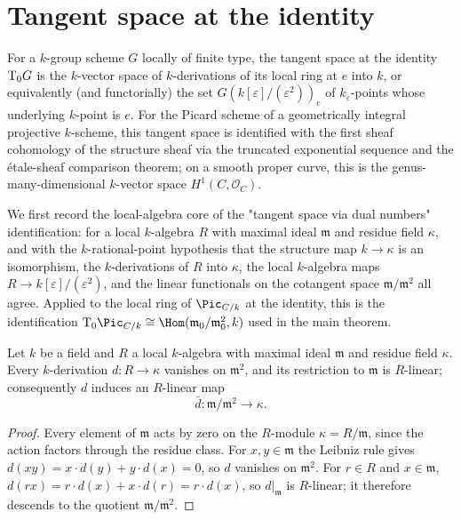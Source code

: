\section{Tangent space at the identity}
\label{sec:pic0_tangent_space}

For a \(k\)-group scheme \(G\) locally of finite type, the tangent
space at the identity \(\textup T_0 G\) is the \(k\)-vector space of
\(k\)-derivations of its local ring at \(e\) into \(k\), or
equivalently (and functorially) the set
\(G(k[\varepsilon]/(\varepsilon^2))_e\) of \(k_\varepsilon\)-points
whose underlying \(k\)-point is \(e\). For the Picard scheme of a
geometrically integral projective \(k\)-scheme, this tangent space is
identified with the first sheaf cohomology of the structure sheaf via
the truncated exponential sequence and the étale-sheaf comparison
theorem; on a smooth proper curve, this is the genus-many-dimensional
\(k\)-vector space \(H^1(C, \mathcal{O}_C)\).

We first record the local-algebra core of the "tangent space via dual
numbers" identification: for a local \(k\)-algebra \(R\) with maximal
ideal \(\mathfrak m\) and residue field \(\kappa\), and with the
\(k\)-rational-point hypothesis that the structure map
\(k \to \kappa\) is an isomorphism, the \(k\)-derivations of \(R\)
into \(\kappa\), the local \(k\)-algebra maps
\(R \to k[\varepsilon]/(\varepsilon^2)\), and the linear functionals
on the cotangent space \(\mathfrak m/\mathfrak m^2\) all agree.
Applied to the local ring of \(\Pic_{C/k}\) at the identity, this is
the identification \(\tu T_0 \Pic_{C/k} \cong
\Hom(\mathfrak m_0/\mathfrak m_0^2, k)\) used in the main theorem.

\begin{lemma}\leanok
  \label{lem:tangent_derivation_descends}
  Let \(k\) be a field and \(R\) a local \(k\)-algebra with maximal
  ideal \(\mathfrak m\) and residue field \(\kappa\). Every
  \(k\)-derivation \(d : R \to \kappa\) vanishes on
  \(\mathfrak m^2\), and its restriction to \(\mathfrak m\) is
  \(R\)-linear; consequently \(d\) induces an \(R\)-linear map
  \[
    \bar d : \mathfrak m/\mathfrak m^2 \longrightarrow \kappa .
  \]
\end{lemma}

\begin{proof}\leanok
  Every element of \(\mathfrak m\) acts by zero on the \(R\)-module
  \(\kappa = R/\mathfrak m\), since the action factors through the
  residue class. For \(x, y \in \mathfrak m\) the Leibniz rule gives
  \(d(xy) = x \cdot d(y) + y \cdot d(x) = 0\), so \(d\) vanishes on
  \(\mathfrak m^2\). For \(r \in R\) and \(x \in \mathfrak m\),
  \(d(rx) = r \cdot d(x) + x \cdot d(r) = r \cdot d(x)\), so
  \(d|_{\mathfrak m}\) is \(R\)-linear; it therefore descends to the
  quotient \(\mathfrak m/\mathfrak m^2\).
\end{proof}

